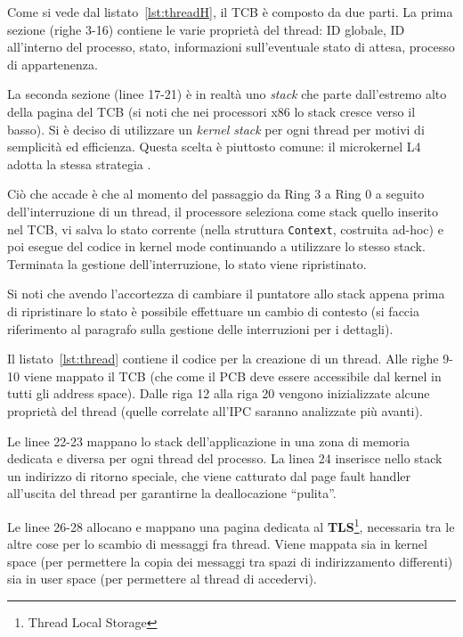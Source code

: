 \documentclass[12pt,a4paper]{report}
\newcommand{\vir}[1]{``#1''}
\begin{document}
				
				
				Come si vede dal listato~\ref{lst:threadH}, il TCB è composto da due parti. La prima sezione (righe 3-16)
				contiene le varie proprietà del thread: ID globale, ID all'interno del processo, stato, informazioni sull'eventuale
				stato di attesa, processo di appartenenza.
				
				La seconda sezione (linee 17-21) è in realtà uno \emph{stack} che parte dall'estremo alto della pagina
				del TCB (si noti che nei processori x86 lo stack cresce verso il basso).
				Si è deciso di utilizzare un \emph{kernel stack} per ogni thread per motivi di semplicità ed efficienza.
				Questa scelta è piuttosto comune: il microkernel L4 adotta la stessa strategia \cite{Neider}.
				
				Ciò che accade è che al momento del passaggio da Ring 3 a Ring 0 a seguito dell'interruzione di un
				thread, il processore seleziona come stack quello inserito nel TCB, vi salva lo stato corrente (nella
				struttura \texttt{Context}, costruita ad-hoc) e poi esegue del codice in kernel mode continuando a utilizzare
				lo stesso stack. Terminata la gestione dell'interruzione, lo stato viene ripristinato.
				
				Si noti che avendo l'accortezza di cambiare il puntatore allo stack appena prima di ripristinare lo stato
				è possibile effettuare un cambio di contesto (si faccia riferimento al paragrafo sulla gestione delle interruzioni
				per i dettagli).
								
				
				
				Il listato~\ref{lst:thread} contiene il codice per la creazione di un thread.
				Alle righe 9-10 viene mappato il TCB (che come il PCB deve essere accessibile dal kernel
				in tutti gli address space). Dalle riga 12 alla riga 20 vengono inizializzate alcune proprietà
				del thread (quelle correlate all'IPC saranno analizzate più avanti).
				
				Le linee 22-23 mappano lo stack dell'applicazione in una zona di memoria dedicata
				e diversa per ogni thread del processo.
				La linea 24 inserisce nello stack un indirizzo di ritorno speciale, che viene catturato
				dal page fault handler all'uscita del thread per garantirne la deallocazione \vir{pulita}.
				
				Le linee 26-28 allocano e mappano una pagina dedicata al \textbf{TLS}\footnote{Thread Local Storage},
				necessaria tra le altre cose per lo scambio di messaggi fra thread. Viene mappata sia in
				kernel space (per permettere la copia dei messaggi tra spazi di indirizzamento differenti)
				sia in user space (per permettere al thread di accedervi).
				
\end{document}
